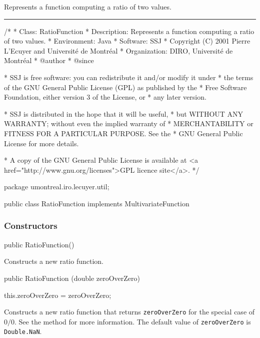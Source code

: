 
Represents a function computing a ratio of two values.

\bigskip\hrule

\begin{code}
\begin{hide}
/*
 * Class:        RatioFunction
 * Description:  Represents a function computing a ratio of two values.
 * Environment:  Java
 * Software:     SSJ 
 * Copyright (C) 2001  Pierre L'Ecuyer and Université de Montréal
 * Organization: DIRO, Université de Montréal
 * @author       
 * @since

 * SSJ is free software: you can redistribute it and/or modify it under
 * the terms of the GNU General Public License (GPL) as published by the
 * Free Software Foundation, either version 3 of the License, or
 * any later version.

 * SSJ is distributed in the hope that it will be useful,
 * but WITHOUT ANY WARRANTY; without even the implied warranty of
 * MERCHANTABILITY or FITNESS FOR A PARTICULAR PURPOSE.  See the
 * GNU General Public License for more details.

 * A copy of the GNU General Public License is available at
   <a href="http://www.gnu.org/licenses">GPL licence site</a>.
 */
\end{hide}
package umontreal.iro.lecuyer.util;\begin{hide}
\end{hide}


public class RatioFunction implements MultivariateFunction\begin{hide} {
   private double zeroOverZero = Double.NaN;
\end{hide}
\end{code}
\subsubsection*{Constructors}
\begin{code}

   public RatioFunction()\begin{hide} {}\end{hide}
\end{code}
\begin{tabb}   Constructs a new ratio function.
\end{tabb}
\begin{code}

   public RatioFunction (double zeroOverZero)\begin{hide} {
      this.zeroOverZero = zeroOverZero;
   }\end{hide}
\end{code}
\begin{tabb}   Constructs a new ratio function that returns
   \texttt{zeroOverZero} for the special case of $0/0$.
   See the   method for more information.
   The default value of \texttt{zeroOverZero} is \texttt{Double.NaN}.
\end{tabb}
\begin{htmlonly}
\end{htmlonly}
